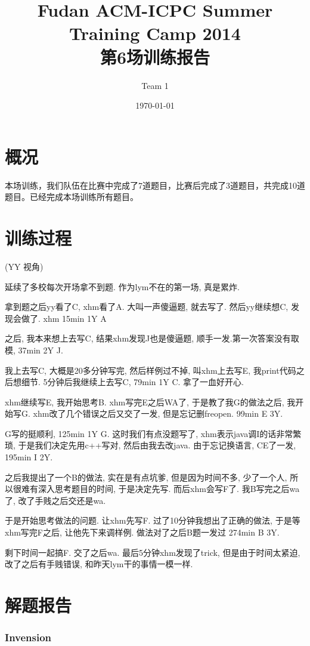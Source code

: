 \documentclass[a4paper, 11pt, nofonts, nocap, fancyhdr]{ctexart}
\title{Fudan ACM-ICPC Summer Training Camp 2014\\第6场训练报告}
\author{Team 1}
\date{\today}
\newcommand{\problem}[1]{\subsubsection{#1}}
\begin{document}
\maketitle

\section{概况}

本场训练，我们队伍在比赛中完成了7道题目，比赛后完成了3道题目，共完成10道题目。已经完成本场训练所有题目。


\section{训练过程}

(YY 视角)

延续了多校每次开场拿不到题. 作为lym不在的第一场, 真是累炸.

拿到题之后yy看了C, xhm看了A. 大叫一声傻逼题, 就去写了. 然后yy继续想C, 发现会做了. xhm 15min 1Y A

之后, 我本来想上去写C, 结果xhm发现J也是傻逼题, 顺手一发.第一次答案没有取模, 37min 2Y J. 

我上去写C, 大概是20多分钟写完, 然后样例过不掉, 叫xhm上去写E, 我print代码之后想细节. 5分钟后我继续上去写C, 79min 1Y C. 拿了一血好开心. 

xhm继续写E, 我开始思考B. xhm写完E之后WA了, 于是教了我G的做法之后, 我开始写G. xhm改了几个错误之后又交了一发, 但是忘记删freopen. 99min E 3Y. 

G写的挺顺利, 125min 1Y G. 这时我们有点没题写了, xhm表示java调I的话非常繁琐, 于是我们决定先用c++写对, 然后由我去改java. 由于忘记换语言, CE了一发, 195min I 2Y.

之后我提出了一个B的做法, 实在是有点坑爹, 但是因为时间不多, 少了一个人, 所以很难有深入思考题目的时间, 于是决定先写. 而后xhm会写F了. 我B写完之后wa了, 改了手贱之后交还是wa. 

于是开始思考做法的问题. 让xhm先写F. 过了10分钟我想出了正确的做法, 于是等xhm写完F之后, 让他先下来调样例. 做法对了之后B题一发过 274min B 3Y. 

剩下时间一起搞F. 交了之后wa. 最后5分钟xhm发现了trick, 但是由于时间太紧迫, 改了之后有手贱错误, 和昨天lym干的事情一模一样.

\section{解题报告}

\problem{Invension}
\end{document}

